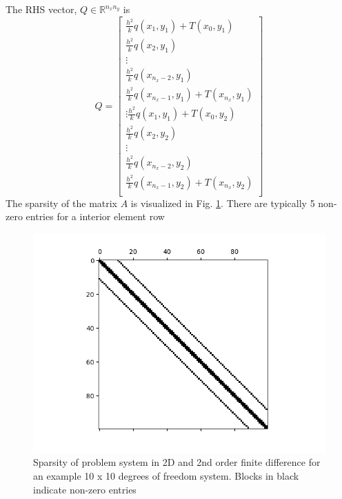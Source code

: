 \documentclass[letterpaper,12pt]{article}
\begin{document}
The RHS vector, $Q \in \mathbb{R}^{n_x n_y}$ is
\[
Q= 
\begin{bmatrix}
\frac{h^2}{k}q(x_1, y_1) + T(x_0, y_1) \\
\frac{h^2}{k}q(x_2, y_1) \\
\vdots \\
\frac{h^2}{k}q(x_{n_x-2}, y_1) \\
\frac{h^2}{k}q(x_{n_x-1}, y_1) + T(x_{n_x}, y_1) \\
\vdots
\frac{h^2}{k}q(x_1, y_1) + T(x_0, y_2) \\
\frac{h^2}{k}q(x_2, y_2) \\
\vdots \\
\frac{h^2}{k}q(x_{n_x-2}, y_2) \\
\frac{h^2}{k}q(x_{n_x-1}, y_2) + T(x_{n_x}, y_2) \\
\end{bmatrix}
\]
The sparsity of the matrix $A$ is visualized in Fig. \ref{2D2ndSparse}. There are typically 5 non-zero entries for a interior element row
 
\begin{figure}[h]
\centering
\includegraphics[width=.9 \textwidth]{twod_sparse_2.png}
\caption{Sparsity of problem system in 2D and 2nd order finite difference for an example 10 x 10 degrees of freedom system. Blocks in black indicate non-zero entries}
\label{2D2ndSparse}
\end{figure}
\end{document}
